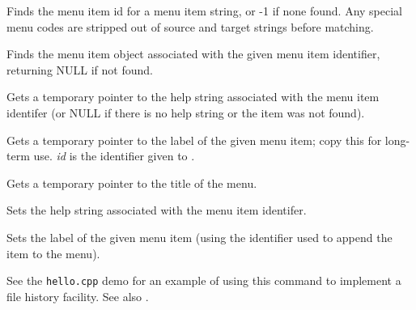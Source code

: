 

Finds the menu item id for a menu item string, or -1 if none found.
Any special menu codes are stripped out of source and target strings
before matching.



Finds the menu item object associated with the given menu item identifier,
returning NULL if not found.



Gets a temporary pointer to the help string associated with the menu
item identifer (or NULL if there is no help string or the item was not
found).



Gets a temporary pointer to the label of the given menu item; copy this for
long-term use. {\it id} is the identifier given to .



Gets a temporary pointer to the title of the menu.



Sets the help string associated with the menu item identifer.

\label{wxmenusetlabel}


Sets the label of the given menu item (using the identifier used to
append the item to the menu).

See the {\tt hello.cpp} demo for an example of using this command to
implement a file history facility. See also .




